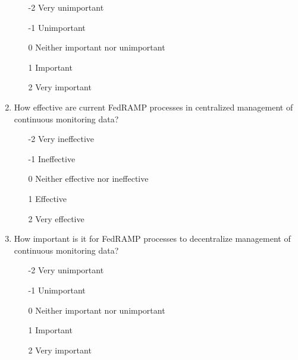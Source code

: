 \documentclass{jdf}
\begin{document}
\begin{enumerate}
    \begin{enumerate}
        \item [-2] Very unimportant
        \item [-1] Unimportant
        \item  [0] Neither important nor unimportant
        \item  [1] Important
        \item  [2] Very important
    \end{enumerate}
    \item How effective are current FedRAMP processes in centralized management of continuous monitoring data?
    \begin{enumerate}
        \item [-2] Very ineffective
        \item [-1] Ineffective
        \item  [0] Neither effective nor ineffective
        \item  [1] Effective 
        \item  [2] Very effective
    \end{enumerate}
    \item How important is it for FedRAMP processes to decentralize management of continuous monitoring data?
    \begin{enumerate}
        \item [-2] Very unimportant
        \item [-1] Unimportant
        \item  [0] Neither important nor unimportant
        \item  [1] Important
        \item  [2] Very important
    \end{enumerate}
\end{enumerate}
\end{document}
